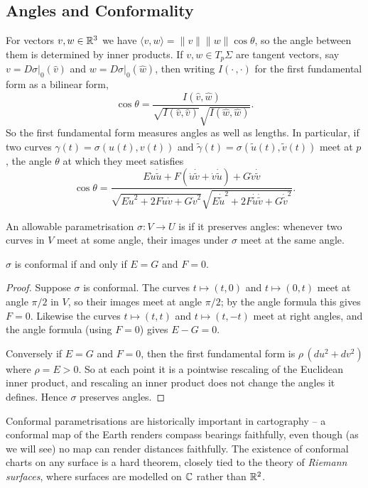 \documentclass[a4paper]{scrartcl}
\begin{document}
\subsection{Angles and Conformality}

For vectors $v, w \in \mathbb{R}^3$ we have $\langle v, w \rangle = \|v\| \|w\| \cos\theta$, so the angle between them is determined by inner products. If $v, w \in T_p \Sigma$ are tangent vectors, say $v = D\sigma|_0(\hat{v})$ and $w = D\sigma|_0(\hat{w})$, then writing $I(\cdot\, , \cdot)$ for the first fundamental form as a bilinear form,
$$
\cos \theta = \frac{I(\hat v, \hat w)}{\sqrt{I(\hat v, \hat v)}\sqrt{I(\hat w, \hat w)}}.
$$
So the first fundamental form measures angles as well as lengths. In particular, if two curves $\gamma(t) = \sigma(u(t), v(t))$ and $\tilde{\gamma}(t) = \sigma(\tilde{u}(t), \tilde v(t))$ meet at $p$, the angle $\theta$ at which they meet satisfies
$$
\cos\theta = \frac{E \dot u \dot{\tilde u} + F (\dot u \dot{\tilde v} + \dot v \dot{\tilde u}) + G \dot v \dot{\tilde v}}{\sqrt{E \dot u^2 + 2F \dot u \dot v + G \dot v^2}\sqrt{E \dot{\tilde u}^2 + 2F \dot{\tilde u}\dot{\tilde v} + G \dot{\tilde v}^2}}.
$$

\begin{definition}[Conformal]
    An allowable parametrisation $\sigma: V \rightarrow U$ is  if it preserves angles: whenever two curves in $V$ meet at some angle, their images under $\sigma$ meet at the same angle.
\end{definition}

\begin{lemma}
    $\sigma$ is conformal if and only if $E = G$ and $F = 0$.
\end{lemma}
\begin{proof}
    Suppose $\sigma$ is conformal. The curves $t \mapsto (t, 0)$ and $t \mapsto (0, t)$ meet at angle $\pi/2$ in $V$, so their images meet at angle $\pi/2$; by the angle formula this gives $F = 0$. Likewise the curves $t \mapsto (t, t)$ and $t \mapsto (t, -t)$ meet at right angles, and the angle formula (using $F = 0$) gives $E - G = 0$.

    Conversely if $E = G$ and $F = 0$, then the first fundamental form is $\rho\,(du^2 + dv^2)$ where $\rho = E > 0$. So at each point it is a pointwise rescaling of the Euclidean inner product, and rescaling an inner product does not change the angles it defines. Hence $\sigma$ preserves angles.
\end{proof}

\begin{remark}
    Conformal parametrisations are historically important in cartography -- a conformal map of the Earth renders compass bearings faithfully, even though (as we will see) no map can render distances faithfully. The existence of conformal charts on any surface is a hard theorem, closely tied to the theory of \emph{Riemann surfaces}, where surfaces are modelled on $\mathbb{C}$ rather than $\mathbb{R}^2$.
\end{remark}
\end{document}

